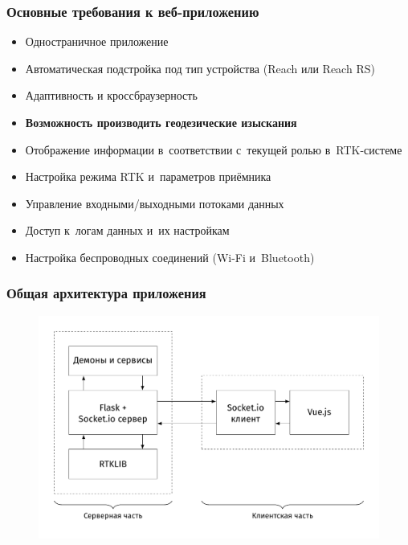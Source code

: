 \documentclass[xetex,с,aspectratio=169]{beamer}
\begin{document}
%
%
\begin{frame}
  \frametitle{Основные требования к веб-приложению}
  
  \large
  
  \begin{itemize}
    \setlength\itemsep{0.5em}
    \item Одностраничное приложение
    \item Автоматическая подстройка под тип устройства (Reach или Reach RS)
    \item Адаптивность и кроссбраузерность
  \end{itemize}
  \begin{center}
    \vskip -0.7cm
    \color{ifmoblue}{\rule{.5\textwidth}{0.5pt}}
  \end{center}
  \vskip -0.5cm
  \begin{itemize}
    \setlength\itemsep{0.5em}
    \item \textbf{Возможность производить геодезические изыскания}
    \item Отображение информации в~соответствии с~текущей ролью в~RTK-системе
    \item Настройка режима RTK и~параметров приёмника
    \item Управление входными/выходными потоками данных
    \item Доступ к~логам данных и~их настройкам
    \item Настройка беспроводных соединений (Wi-Fi и~Bluetooth)
  \end{itemize}
\end{frame}


%
%
\begin{frame}
  \frametitle{Общая архитектура приложения}
  \vskip -0.5cm
  \begin{figure}[h]
    \centering
    \includegraphics[width=.75\textwidth]{../img/tikz/system-architecture/pic_sans_no-border}
  \end{figure}
\end{frame}
\end{document}

